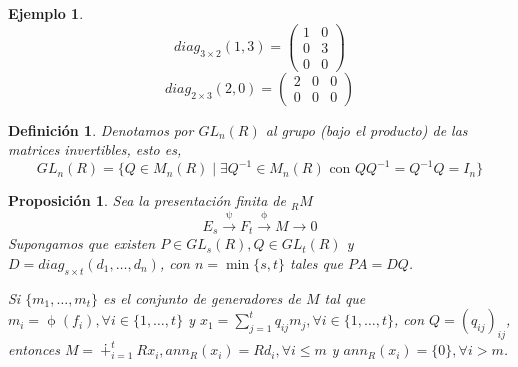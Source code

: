 \documentclass[11pt,a4paper]{article}
\theoremstyle{break}
\newtheorem{example}[theorem]{Ejemplo}
\newtheorem{definition}[theorem]{Definición}
\newtheorem{proposition}[theorem]{Proposición}
\begin{document}
\begin{example}
$$diag_{3 \times 2}(1, 3) = \begin{pmatrix}
1 & 0 \\
0 & 3 \\
0 & 0
\end{pmatrix}$$
$$diag_{2 \times 3}(2, 0) = \begin{pmatrix}
2 & 0 & 0 \\
0 & 0 & 0
\end{pmatrix}$$
\end{example}

\begin{definition}
Denotamos por $GL_{n}(R)$ al grupo (bajo el producto) de las matrices invertibles, esto es,
$$GL_{n}(R) = \{Q \in M_{n}(R) \mid \exists Q^{-1} \in M_{n}(R) \text{ con } QQ^{-1} = Q^{-1}Q = I_{n}\}$$
\end{definition}

\begin{proposition}
Sea la presentación finita de $_{R}M$
$$E_{s} \overset{\uppsi}{\to} F_{t} \overset{\upphi}{\to} M \to 0$$
Supongamos que existen $P \in GL_{s}(R), Q \in GL_{t}(R)$ y \\ $D = diag_{s \times t}(d_{1}, \dots, d_{n})$, con $n = \min\{s, t\}$ tales que $PA = DQ$.

Si $\{m_{1}, \dots, m_{t}\}$ es el conjunto de generadores de $M$ tal que $m_{i} = \upphi(f_{i}), \forall i \in \{1, \dots, t\}$ y $x_{1} = \sum_{j=1}^{t} q_{ij}m_{j}, \forall i \in \{1, \dots, t\}$, con $Q = (q_{ij})_{ij}$, entonces $M = \dotplus_{i=1}^{t} Rx_{i}, ann_{R}(x_{i}) = Rd_{i}, \forall i \leq m$ y $ann_{R}(x_{i}) = \{0\}, \forall i > m$.
\end{proposition}
\end{document}
